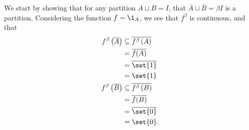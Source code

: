 \documentclass[10pt]{mypackage}
\begin{document}
\begin{solution}
  We start by showing that for any partition $A\sqcup B = I$, that $\overline{A}\sqcup \overline{B} = \beta I$ is a partition. Considering the function $f = \1_{A}$, we see that $f^{\beta}$ is continuous, and that
  \begin{align*}
    f^{\beta}\left(\overline{A}\right) &\subseteq \overline{f^{\beta}\left(A\right)}\\
                                       &= \overline{f(A)}\\
                                       &= \overline{\set{1}}\\
                                       &= \set{1}\\
    f^{\beta}\left(\overline{B}\right) &\subseteq \overline{f^{\beta}\left(B\right)}\\
                                       &= \overline{f(B)}\\
                                       &= \overline{\set{0}}\\
                                       &= \set{0}.
  \end{align*}
\end{solution}
\end{document}
